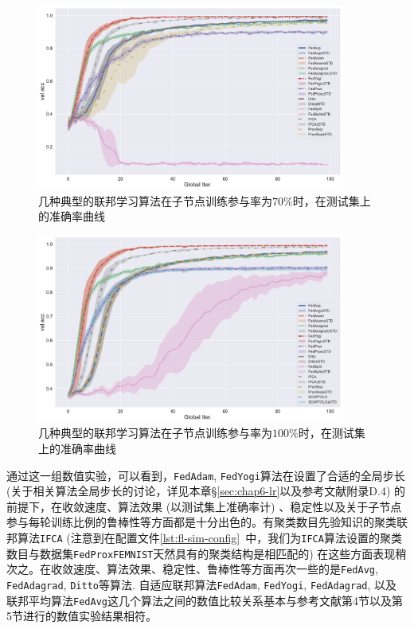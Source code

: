 \begin{figure}[H]
    \centering
    \includegraphics[width=0.9\textwidth]{figures/standard-test-ratio-70-val-acc.pdf}
    \caption{几种典型的联邦学习算法在子节点训练参与率为$70\%$时，在测试集上的准确率曲线}
    \label{fig:standard-test-ratio-70-val-acc}
\end{figure}

\begin{figure}[ht]
    \centering
    \includegraphics[width=0.9\textwidth]{figures/standard-test-ratio-100-val-acc.pdf}%
    \caption{几种典型的联邦学习算法在子节点训练参与率为$100\%$时，在测试集上的准确率曲线}
    \label{fig:standard-test-ratio-100-val-acc}
\end{figure}

通过这一组数值实验，可以看到，\texttt{FedAdam}, \texttt{FedYogi}算法在设置了合适的全局步长 (关于相关算法全局步长的讨论，详见本章\S\ref{sec:chap6-lr}以及参考文献\parencite{reddi2020fed_opt}附录D.4) 的前提下，在收敛速度、算法效果 (以测试集上准确率计) 、稳定性以及关于子节点参与每轮训练比例的鲁棒性等方面都是十分出色的。有聚类数目先验知识的聚类联邦算法\texttt{IFCA} (注意到在配置文件\ref{lst:fl-sim-config}~中，我们为\texttt{IFCA}算法设置的聚类数目与数据集\texttt{FedProxFEMNIST}天然具有的聚类结构是相匹配的) 在这些方面表现稍次之。在收敛速度、算法效果、稳定性、鲁棒性等方面再次一些的是\texttt{FedAvg}, \texttt{FedAdagrad}, \texttt{Ditto}等算法. 自适应联邦算法\texttt{FedAdam}, \texttt{FedYogi}, \texttt{FedAdagrad}, 以及联邦平均算法\texttt{FedAvg}这几个算法之间的数值比较关系基本与参考文献\parencite{reddi2020fed_opt}第4节以及第5节进行的数值实验结果相符。

